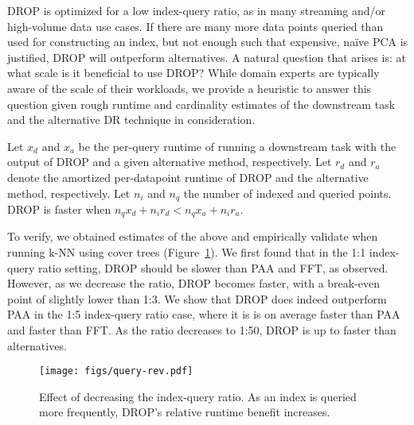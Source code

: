 

 DROP is optimized for a low index-query ratio, as in many streaming and/or high-volume data use cases.
If there are many more data points queried than used for constructing an index, but not enough such that expensive, na\"ive PCA is justified, DROP will outperform alternatives. 
A natural question that arises is: at what scale is it beneficial to use DROP?
While domain experts are typically aware of the scale of their workloads, we provide a heuristic to answer this question given rough runtime and cardinality estimates of the downstream task and the alternative DR technique in consideration.

Let $x_d$ and $x_a$ be the per-query runtime of running a downstream task with the output of DROP and a given alternative method, respectively. 
Let $r_d$ and $r_a$ denote the amortized per-datapoint runtime of DROP and the alternative method, respectively. 
Let $n_i$ and $n_q$ the number of indexed and queried points. 
DROP is faster when $n_q x_d + n_i r_d < n_q x_a + n_i r_a$.

To verify, we obtained estimates of the above and empirically validate when running k-NN using cover trees (Figure~\ref{fig:query}).
We first found that in the 1:1 index-query ratio setting, DROP should be slower than PAA and FFT, as observed. 
However, as we decrease the ratio, DROP becomes faster, with a break-even point of slightly lower than 1:3. 
We show that DROP does indeed outperform PAA  in the 1:5 index-query ratio case, where it is is on average \red{$1.51\times$} faster than PAA and \red{$1.03\times$} faster than FFT. 
As the ratio decreases to 1:50, DROP is up to \red{$1.9\times$} faster than alternatives.  


\begin{figure}
\texttt{[image: figs/query-rev.pdf]}
\caption[]{Effect of decreasing the index-query ratio. As an index is queried more frequently, DROP's relative runtime benefit  increases.}
\label{fig:query}
\end{figure}

